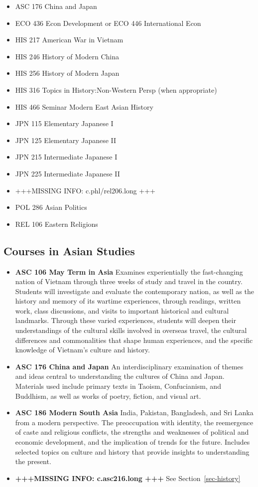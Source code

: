\documentclass[
  letterpaper,
]{scrbook}
\providecommand{\tightlist}{%
  \setlength{\itemsep}{0pt}\setlength{\parskip}{0pt}}
\begin{document}
\begin{itemize}
\tightlist
\item
  ASC 176 China and Japan
\item
  ECO 436 Econ Development or ECO 446 International Econ
\item
  HIS 217 American War in Vietnam
\item
  HIS 246 History of Modern China
\item
  HIS 256 History of Modern Japan
\item
  HIS 316 Topics in History:Non-Western Persp (when appropriate)
\item
  HIS 466 Seminar Modern East Asian History
\item
  JPN 115 Elementary Japanese I
\item
  JPN 125 Elementary Japanese II
\item
  JPN 215 Intermediate Japanese I
\item
  JPN 225 Intermediate Japanese II
\item
  +++MISSING INFO: c.phl/rel206.long +++
\item
  POL 286 Asian Politics
\item
  REL 106 Eastern Religions
\end{itemize}

\subsection{Courses in Asian Studies}\label{courses-in-asian-studies}

\begin{itemize}
\tightlist
\item
  \textbf{ASC 106 May Term in Asia} Examines experientially the
  fast-changing nation of Vietnam through three weeks of study and
  travel in the country. Students will investigate and evaluate the
  contemporary nation, as well as the history and memory of its wartime
  experiences, through readings, written work, class discussions, and
  visits to important historical and cultural landmarks. Through these
  varied experiences, students will deepen their understandings of the
  cultural skills involved in overseas travel, the cultural differences
  and commonalities that shape human experiences, and the specific
  knowledge of Vietnam's culture and history.
\item
  \textbf{ASC 176 China and Japan} An interdisciplinary examination of
  themes and ideas central to understanding the cultures of China and
  Japan. Materials used include primary texts in Taoism, Confucianism,
  and Buddhism, as well as works of poetry, fiction, and visual art.
\item
  \textbf{ASC 186 Modern South Asia} India, Pakistan, Bangladesh, and
  Sri Lanka from a modern perspective. The preoccupation with identity,
  the reemergence of caste and religious conflicts, the strengths and
  weaknesses of political and economic development, and the implication
  of trends for the future. Includes selected topics on culture and
  history that provide insights to understanding the present.
\item
  \textbf{+++MISSING INFO: c.asc216.long +++} See
  Section~\ref{sec-history}
\end{itemize}
\end{document}
